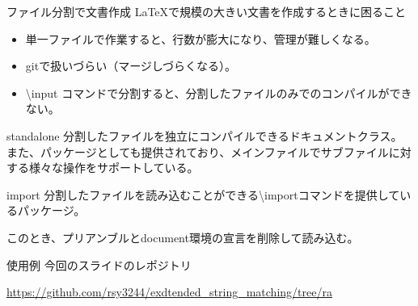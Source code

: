 \documentclass[dvipdfmx,12pt,beamer]{standalone}
\begin{document}
\begin{frame}[fragile]{ファイル分割で文書作成}
	\LaTeX で規模の大きい文書を作成するときに困ること
	\begin{itemize}
		\item 単一ファイルで作業すると、行数が膨大になり、管理が難しくなる。
		\item gitで扱いづらい（マージしづらくなる）。
		\item \textbackslash input コマンドで分割すると、分割したファイルのみでのコンパイルができない。
	\end{itemize}

	\begin{block}{standalone}
		分割したファイルを独立にコンパイルできるドキュメントクラス。
		また、パッケージとしても提供されており、メインファイルでサブファイルに対する様々な操作をサポートしている。
	\end{block}
	\begin{block}{import}
		分割したファイルを読み込むことができる\textbackslash importコマンドを提供しているパッケージ。

		このとき、プリアンブルとdocument環境の宣言を削除して読み込む。
	\end{block}
\end{frame}

\begin{frame}{使用例}
	今回のスライドのレポジトリ

	\url{https://github.com/rsy3244/exdtended_string_matching/tree/ra}
\end{frame}
\end{document}
